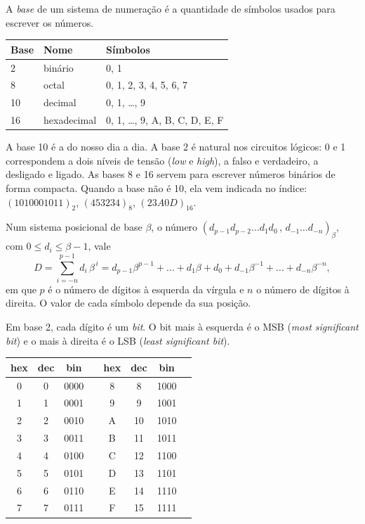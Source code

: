 A \emph{base} de um sistema de numeração é a quantidade de símbolos usados para escrever
os números.

\begin{center}
\begin{tabular}{lll}
\toprule
Base & Nome & Símbolos\\
\midrule
2  & binário      & 0, 1\\
8  & octal        & 0, 1, 2, 3, 4, 5, 6, 7\\
10 & decimal      & 0, 1, \dots, 9\\
16 & hexadecimal  & 0, 1, \dots, 9, A, B, C, D, E, F\\
\bottomrule
\end{tabular}
\end{center}

A base 10 é a do nosso dia a dia. A base 2 é natural nos circuitos lógicos: 0 e 1 correspondem a
dois níveis de tensão (\emph{low} e \emph{high}), a falso e verdadeiro, a desligado e ligado.
As bases 8 e 16 servem para escrever números binários de forma compacta. Quando a base não é
10, ela vem indicada no índice: $(1010001011)_2$, $(453234)_8$, $(23A0D)_{16}$.

\begin{definicao}
Num sistema posicional de base $\beta$, o número
$(d_{p-1}d_{p-2}\dots d_1d_0\,,\,d_{-1}\dots d_{-n})_\beta$, com $0\le d_i\le\beta-1$, vale
\[
D=\sum_{i=-n}^{p-1}d_i\,\beta^{\,i}
 =d_{p-1}\beta^{p-1}+\dots+d_1\beta+d_0+d_{-1}\beta^{-1}+\dots+d_{-n}\beta^{-n},
\]
em que $p$ é o número de dígitos à esquerda da vírgula e $n$ o número de dígitos à direita.
O valor de cada símbolo depende da sua posição.
\end{definicao}

Em base 2, cada dígito é um \emph{bit}. O bit mais à esquerda é o MSB
(\emph{most significant bit}) e o mais à direita é o LSB (\emph{least significant bit}).

\begin{center}
\small
\begin{tabular}{cccc|cccc}
\toprule
hex & dec & bin & & hex & dec & bin\\
\midrule
0 & 0 & 0000 && 8 & 8  & 1000\\
1 & 1 & 0001 && 9 & 9  & 1001\\
2 & 2 & 0010 && A & 10 & 1010\\
3 & 3 & 0011 && B & 11 & 1011\\
4 & 4 & 0100 && C & 12 & 1100\\
5 & 5 & 0101 && D & 13 & 1101\\
6 & 6 & 0110 && E & 14 & 1110\\
7 & 7 & 0111 && F & 15 & 1111\\
\bottomrule
\end{tabular}
\end{center}

